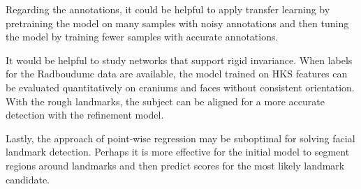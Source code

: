 \documentclass[class=article, crop=false]{standalone}
\begin{document}
Regarding the annotations, it could be helpful to apply transfer learning by pretraining the model on many samples with noisy annotations and then tuning the model by training fewer samples with accurate annotations.

It would be helpful to study networks that support rigid invariance. When labels for the Radboudumc data are available, the model trained on HKS features can be evaluated quantitatively on craniums and faces without consistent orientation. With the rough landmarks, the subject can be aligned for a more accurate detection with the refinement model.

Lastly, the approach of point-wise regression may be suboptimal for solving facial landmark detection. Perhaps it is more effective for the initial model to segment regions around landmarks and then predict scores for the most likely landmark candidate.
\end{document}
